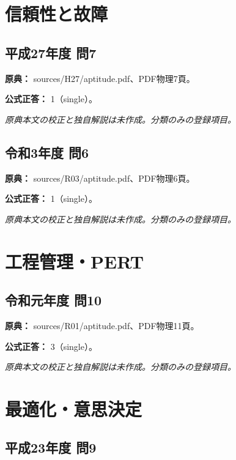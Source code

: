 \section{信頼性と故障}

\subsection{平成27年度 問7}
\label{q:h27-reg-apt-07}

\noindent\textbf{原典：} sources/H27/aptitude.pdf、PDF物理7頁。

\textbf{公式正答：} 1（single）。

\par\textit{原典本文の校正と独自解説は未作成。分類のみの登録項目。}

\subsection{令和3年度 問6}
\label{q:r03-reg-apt-06}

\noindent\textbf{原典：} sources/R03/aptitude.pdf、PDF物理6頁。

\textbf{公式正答：} 1（single）。

\par\textit{原典本文の校正と独自解説は未作成。分類のみの登録項目。}

\section{工程管理・PERT}

\subsection{令和元年度 問10}
\label{q:r01-reg-apt-10}

\noindent\textbf{原典：} sources/R01/aptitude.pdf、PDF物理11頁。

\textbf{公式正答：} 3（single）。

\par\textit{原典本文の校正と独自解説は未作成。分類のみの登録項目。}

\section{最適化・意思決定}

\subsection{平成23年度 問9}
\label{q:h23-reg-apt-09}

